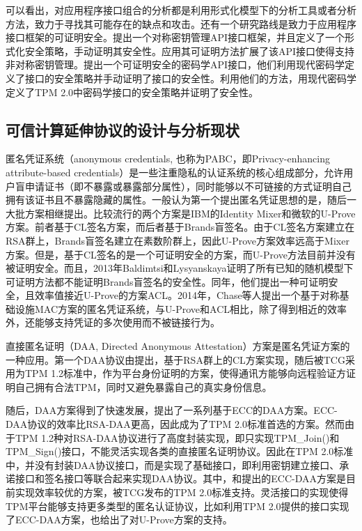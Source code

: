 可以看出，对应用程序接口组合的分析都是利用形式化模型下的分析工具或者分析方法，致力于寻找其可能存在的缺点和攻击。还有一个研究路线是致力于应用程序接口框架的可证明安全。\citet{Cortier2009A,Cortier2014A}提出一个对称密钥管理API接口框架，并且定义了一个形式化安全策略，手动证明其安全性。\citet{Daubignard2014A}应用其可证明方法扩展了该API接口使得支持非对称密钥管理。\citet{Cachin2009A}提出一个可证明安全的密码学API接口，他们利用现代密码学定义了接口的安全策略并手动证明了接口的安全性。\citet{ChuF15}利用他们的方法，用现代密码学定义了TPM 2.0中密码学接口的安全策略并证明了安全性。

\subsection{可信计算延伸协议的设计与分析现状}

匿名凭证系统（anonymous credentials, 也称为PABC，即Privacy-enhancing attribute-based credentials）是一些注重隐私的认证系统的核心组成部分，允许用户盲申请证书（即不暴露或暴露部分属性），同时能够以不可链接的方式证明自己拥有该证书且不暴露隐藏的属性。一般认为第一个提出匿名凭证思想的是\citet{chaum1985security}，随后一大批方案相继提出。比较流行的两个方案是IBM的Identity Mixer\citep{camenisch2010specification}和微软的U-Prove方案\citep{paquin2011u}。前者基于CL签名方案\citep{camenisch2001efficient,camenisch2002signature,camenisch2004signature}，而后者基于Brands盲签名\citep{brands2000rethinking}。由于CL签名方案建立在RSA群上，Brands盲签名建立在素数阶群上，因此U-Prove方案效率远高于Mixer方案。但是，基于CL签名的是一个可证明安全的方案，而U-Prove方法目前并没有被证明安全。而且，2013年Baldimtsi和Lysyanskaya\citep{baldimtsi2013security}证明了所有已知的随机模型下可证明方法都不能证明Brands盲签名的安全性。同年，他们提出一种可证明安全，且效率值接近U-Prove的方案ACL\citep{baldimtsi2013anonymous}。2014年，Chase等人提出一个基于对称基础设施MAC方案的匿名凭证系统\citep{chase2014algebraic}，与U-Prove和ACL相比，除了得到相近的效率外，还能够支持凭证的多次使用而不被链接行为。

直接匿名证明（DAA, Directed Anonymous Attestation）方案是匿名凭证方案的一种应用。第一个DAA协议由\citet{brickell2004direct}提出，基于RSA群上的CL方案实现，随后被TCG采用为TPM 1.2标准中，作为平台身份证明的方案，使得通讯方能够向远程验证方证明自己拥有合法TPM，同时又避免暴露自己的真实身份信息。

随后，DAA方案得到了快速发展，提出了一系列基于ECC的DAA方案\citep{brickell2008new,xiaofeng2008direct,brickell2009simplified,chen2009daa,brickell2010pairing,chen2010design}。ECC-DAA协议的效率比RSA-DAA更高，因此成为了TPM 2.0标准首选的方案。然而由于TPM 1.2种对RSA-DAA协议进行了高度封装实现，即只实现TPM\_Join()和TPM\_Sign()接口，不能灵活实现各类的直接匿名证明协议。因此在TPM 2.0标准中，并没有封装DAA协议接口，而是实现了基础接口，即利用密钥建立接口、承诺接口和签名接口等联合起来实现DAA协议。其中，\citet{chen2010design}和\citet{brickell2010pairing}提出的ECC-DAA方案是目前实现效率较优的方案，被TCG发布的TPM 2.0标准支持。灵活接口的实现使得TPM平台能够支持更多类型的匿名认证协议，比如\citet{chen2013flexible}利用TPM 2.0提供的接口实现了ECC-DAA方案，也给出了对U-Prove方案的支持。

